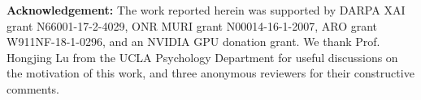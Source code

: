 \documentclass{article}
\begin{document}
\noindent\textbf{Acknowledgement:}
The work reported herein was supported by DARPA XAI grant N66001-17-2-4029, ONR MURI grant N00014-16-1-2007, ARO grant W911NF-18-1-0296, and an NVIDIA GPU donation grant. We thank Prof. Hongjing Lu from the UCLA Psychology Department for useful discussions on the motivation of this work, and three anonymous reviewers for their constructive comments.

\newpage
{}

\setlength{\bibsep}{6pt plus 9pt}


\end{document}
